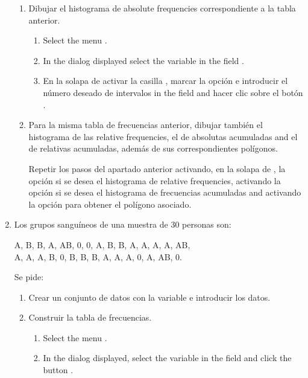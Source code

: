 \begin{enumerate}[leftmargin=*]
\begin{enumerate}
\item  Dibujar el histograma de absolute frequencies correspondiente a la tabla anterior.
\begin{indication}
\begin{enumerate}
\item Select the menu .
\item In the dialog displayed select the variable  in the field .
\item En la solapa de  activar la casilla , marcar la opción  e introducir el número deseado de intervalos in the field  and hacer clic sobre el botón
.
\end{enumerate}
\end{indication}

\item Para la misma tabla de frecuencias anterior, dibujar también el histograma de las relative frequencies, el de
absolutas acumuladas and el de relativas acumuladas, además de sus correspondientes polígonos.
\begin{indication}Repetir los pasos del apartado anterior activando, en la solapa de ,
la opción  si se desea el histograma de relative frequencies, activando la opción
 si se desea el histograma de frecuencias acumuladas and activando la opción
 para obtener el polígono asociado.
\end{indication}
\end{enumerate}

\item Los grupos sanguíneos de una muestra de 30 personas son:
\begin{center}
A, B, B, A, AB, 0, 0, A, B, B, A, A, A, A, AB,\\
A, A, A, B, 0, B, B, B, A, A, A, 0, A, AB, 0. 
\end{center}
Se pide:
\begin{enumerate}
\item Crear un conjunto de datos con la variable  e introducir los datos.

\item Construir la tabla de frecuencias.
\begin{indication}
\begin{enumerate}
\item Select the menu  .
\item In the dialog displayed, select the variable  in the field
 and click the button .
\end{enumerate}
\end{indication}


\end{enumerate}
\end{enumerate}
